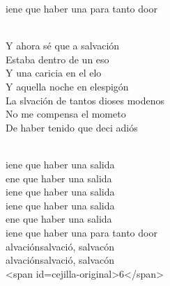 \begin{cancion}
	iene que haber una para tanto door\\\jump\\
	\begin{chorus}%
	Y ahora sé que a salvación\\
	Estaba dentro de un eso\\
	Y una caricia en el elo\\
	Y aquella noche en elespigón\\
\jump
	La slvación de tantos dioses modenos\\
	No me compensa el mometo\\
	De haber tenido que deci adiós\\
	\end{chorus}%
	\jump\\
	iene que haber una salida\\
	ene que haber una salida\\
	iene que haber una salida\\
\jump
	iene que haber una salida\\
	ene que haber una salida\\
	iene que haber una para tanto door\\
\jump
	alvaciónsalvació, salvacón\\
	alvaciónsalvació, salvacón\\
<span id=cejilla-original>6</span>\\
\end{cancion}%
